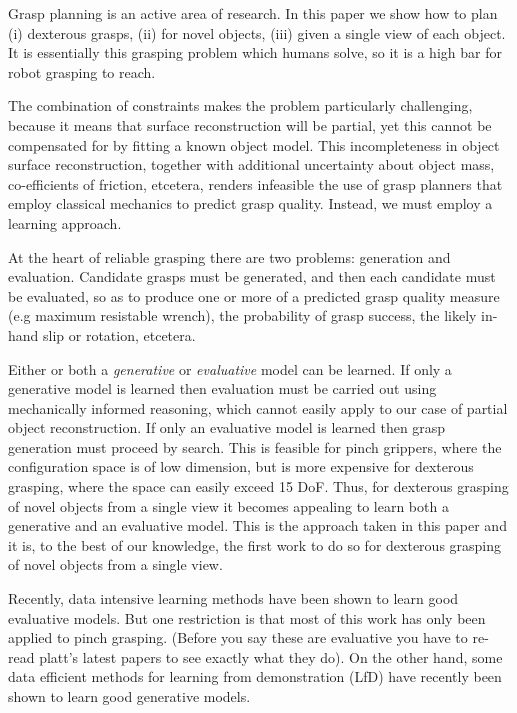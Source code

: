 Grasp planning is an active area of research. In this paper we show how to plan (i) dexterous grasps, (ii) for novel objects, (iii) given a single view of each object. It is essentially this grasping problem which humans solve, so it is a high bar for robot grasping to reach. 

The combination of constraints makes the problem particularly challenging, because it means that surface reconstruction will be partial, yet this cannot be compensated for by fitting a known object model. This incompleteness in object surface reconstruction, together with additional uncertainty about object mass, co-efficients of friction, etcetera, renders infeasible the use of grasp planners that employ classical mechanics to predict grasp quality. Instead, we must employ a learning approach.

At the heart of reliable grasping there are two problems: generation and evaluation. Candidate grasps must be generated, and then each candidate must be evaluated, so as to produce one or more of a predicted grasp quality measure (e.g maximum resistable wrench), the probability of grasp success, the likely in-hand slip or rotation, etcetera. 

Either or both a {\em generative} or {\em evaluative} model can be learned. If only a generative model is learned then evaluation must be carried out using mechanically informed reasoning, which cannot easily apply to our case of partial object reconstruction. If only an evaluative model is learned then grasp generation must proceed by search. This is feasible for pinch grippers, where the configuration space is of low dimension, but is more expensive for dexterous grasping, where the space can easily exceed 15 DoF. Thus, for dexterous grasping of novel objects from a single view it becomes appealing to learn both a generative and an evaluative model. This is the approach taken in this paper and it is, to the best of our knowledge, the first work to do so for dexterous grasping of novel objects from a single view.

Recently, data intensive learning methods have been shown to learn good evaluative models. %
But one restriction is that most of this work has only been applied to pinch grasping. (Before you say these are evaluative you have to re-read platt's latest papers to see exactly what they do). On the other hand, some data efficient methods for learning from demonstration (LfD) have recently been shown to learn good generative models.  

